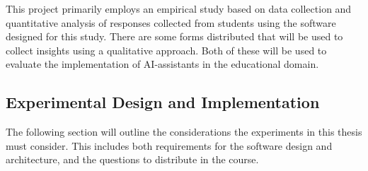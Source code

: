 

This project primarily employs an empirical study based on data collection and quantitative analysis of responses collected from students using the software designed for this study. There are some forms distributed that will be used to collect insights using a qualitative approach. Both of these will be used to evaluate the implementation of AI-assistants in the educational domain.


\subsection{Experimental Design and Implementation}


The following section will outline the considerations the experiments in this thesis must consider. This includes both requirements for the software design and architecture, and the questions to distribute in the course.


